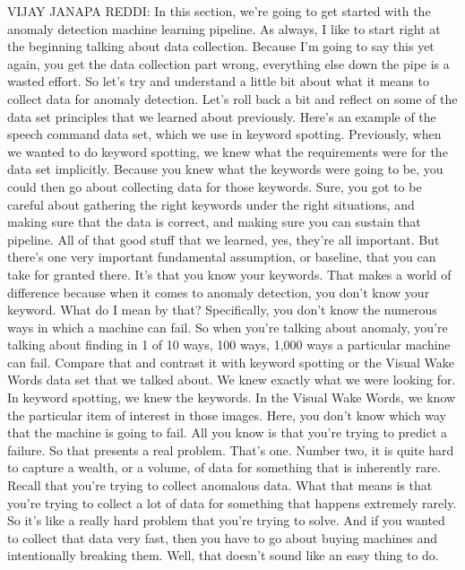   VIJAY JANAPA REDDI: In this section, we're
  going to get started with the anomaly detection machine learning pipeline.
  As always, I like to start right at the beginning talking
  about data collection.
  Because I'm going to say this yet again, you get the data collection part wrong,
  everything else down the pipe is a wasted effort.
  So let's try and understand a little bit about what it means
  to collect data for anomaly detection.
  Let's roll back a bit and reflect on some of the data set principles
  that we learned about previously.
  Here's an example of the speech command data set,
  which we use in keyword spotting.
  Previously, when we wanted to do keyword spotting,
  we knew what the requirements were for the data set implicitly.
  Because you knew what the keywords were going to be,
  you could then go about collecting data for those keywords.
  Sure, you got to be careful about gathering the right keywords
  under the right situations, and making sure that the data is correct,
  and making sure you can sustain that pipeline.
  All of that good stuff that we learned, yes, they're all important.
  But there's one very important fundamental assumption, or baseline,
  that you can take for granted there.
  It's that you know your keywords.
  That makes a world of difference because when it comes to anomaly detection,
  you don't know your keyword.
  What do I mean by that?
  Specifically, you don't know the numerous ways
  in which a machine can fail.
  So when you're talking about anomaly, you're
  talking about finding in 1 of 10 ways, 100 ways,
  1,000 ways a particular machine can fail.
  Compare that and contrast it with keyword spotting or the Visual Wake
  Words data set that we talked about.
  We knew exactly what we were looking for.
  In keyword spotting, we knew the keywords.
  In the Visual Wake Words, we know the particular item
  of interest in those images.
  Here, you don't know which way that the machine is going to fail.
  All you know is that you're trying to predict a failure.
  So that presents a real problem.
  That's one.
  Number two, it is quite hard to capture a wealth, or a volume, of data
  for something that is inherently rare.
  Recall that you're trying to collect anomalous data.
  What that means is that you're trying to collect a lot of data for something
  that happens extremely rarely.
  So it's like a really hard problem that you're trying to solve.
  And if you wanted to collect that data very fast,
  then you have to go about buying machines and intentionally breaking
  them.
  Well, that doesn't sound like an easy thing to do.
